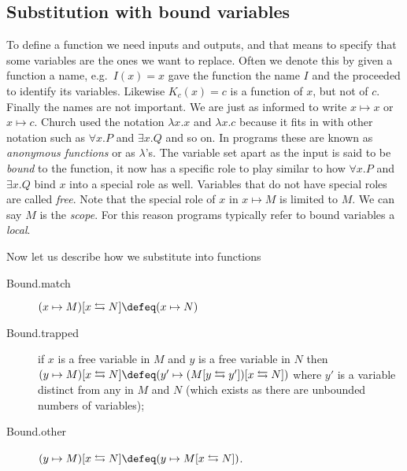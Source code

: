 \subsection{Substitution with bound variables}
To define a function we need inputs and outputs, and that means to specify that
some variables are the ones we want to replace.  Often we denote this by given a
function a name, e.g.\ $I(x)=x$ gave the function the name $I$ and the proceeded
to identify its variables. Likewise $K_c(x)=c$ is a function of $x$, but not of
$c$.  Finally the names are not important.  We are just as informed to write
$x\mapsto x$ or $x\mapsto c$.  Church used the notation $\lambda x.x$ and
$\lambda x.c$ because it fits in with other notation such as $\forall x.P$ and
$\exists x.Q$ and so on.  In programs these are known as \emph{anonymous
functions} or as $\lambda$'s.   The variable set apart as the input is said to
be \emph{bound} to the function, it now has a specific role to play similar to
how $\forall x.P$  and $\exists x.Q$ bind $x$ into a special role as well.
Variables that do not have special roles are called \emph{free}.  Note that the
special role of $x$ in $x\mapsto M$ is limited to $M$.  We can say $M$ is the
\emph{scope}.  For this reason programs typically refer to bound variables a
\emph{local}.

Now let us describe how we substitute into functions
\begin{description}
    \item[Bound.match] $(x\mapsto M)[x\leftrightarrows N]\defeq (x\mapsto N)$
    \item[Bound.trapped]
    if $x$ is a free variable in $M$ and $y$ is a free variable in $N$ then 
    $(y\mapsto M)[x\leftrightarrows N]\defeq (y'\mapsto (M[y\leftrightarrows y'])[x\leftrightarrows N])$ where 
    $y'$ is a variable distinct from any in $M$ and $N$ (which exists 
    as there are unbounded numbers of variables);

    \item[Bound.other] $(y\mapsto M)[x\leftrightarrows N]\defeq (y\mapsto M[x\leftrightarrows N])$.
\end{description}


